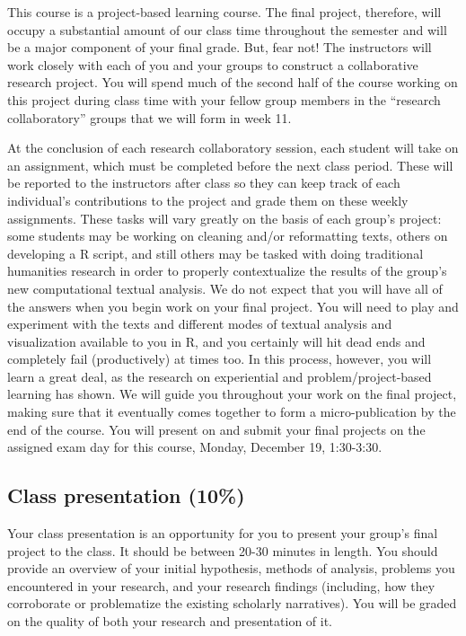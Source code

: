 \documentclass[
]{book}
\begin{document}
This course is a project-based learning course. The final project, therefore, will occupy a substantial amount of our class time throughout the semester and will be a major component of your final grade. But, fear not! The instructors will work closely with each of you and your groups to construct a collaborative research project. You will spend much of the second half of the course working on this project during class time with your fellow group members in the ``research collaboratory'' groups that we will form in week 11.

At the conclusion of each research collaboratory session, each student will take on an assignment, which must be completed before the next class period. These will be reported to the instructors after class so they can keep track of each individual's contributions to the project and grade them on these weekly assignments. These tasks will vary greatly on the basis of each group's project: some students may be working on cleaning and/or reformatting texts, others on developing a R script, and still others may be tasked with doing traditional humanities research in order to properly contextualize the results of the group's new computational textual analysis. We do not expect that you will have all of the answers when you begin work on your final project. You will need to play and experiment with the texts and different modes of textual analysis and visualization available to you in R, and you certainly will hit dead ends and completely fail (productively) at times too. In this process, however, you will learn a great deal, as the research on experiential and problem/project-based learning has shown. We will guide you throughout your work on the final project, making sure that it eventually comes together to form a micro-publication by the end of the course. You will present on and submit your final projects on the assigned exam day for this course, Monday, December 19, 1:30-3:30.

\hypertarget{class-presentation-10}{%
\subsection{Class presentation (10\%)}\label{class-presentation-10}}

Your class presentation is an opportunity for you to present your group's final project to the class. It should be between 20-30 minutes in length. You should provide an overview of your initial hypothesis, methods of analysis, problems you encountered in your research, and your research findings (including, how they corroborate or problematize the existing scholarly narratives). You will be graded on the quality of both your research and presentation of it.
\end{document}

